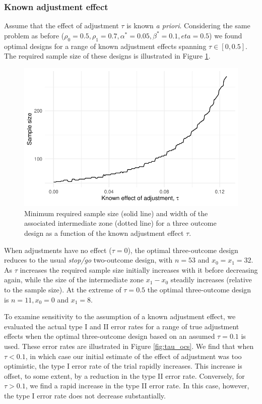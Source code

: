 \documentclass{bmcart}
\begin{document}
\subsubsection{Known adjustment effect}

Assume that the effect of adjustment $\tau$ is known \emph{a priori}. Considering the same problem as before ($\rho_0 = 0.5, \rho_1 = 0.7, \alpha^* = 0.05, \beta^* = 0.1, eta = 0.5$) we found optimal designs for a range of known adjustment effects spanning $\tau \in [0, 0.5]$. The required sample size of these designs is illustrated in Figure \ref{fig:tau_ns}. 

\begin{figure}
\centering
\includegraphics[scale=0.8]{./figures/tau_ns}
\caption{Minimum required sample size (solid line) and width of the associated intermediate zone (dotted line) for a three outcome design as a function of the known adjustment effect $\tau$.}
\label{fig:tau_ns}
\end{figure}

When adjustments have no effect ($\tau = 0$), the optimal three-outcome design reduces to the usual \emph{stop/go} two-outcome design, with $n = 53$ and $x_0 = x_1 = 32$. As $\tau$ increases the required sample size initially increases with it before decreasing again, while the size of the intermediate zone $x_1 - x_0$ steadily increases (relative to the sample size). At the extreme of $\tau = 0.5$ the optimal three-outcome design is $n= 11, x_0 = 0$ and $x_1 = 8$.

To examine sensitivity to the assumption of a known adjustment effect, we evaluated the actual type I and II error rates for a range of true adjustment effects when the optimal three-outcome design based on an assumed $\tau = 0.1$ is used. These error rates are illustrated in Figure \ref{fig:tau_ocs}. We find that when $\tau < 0.1$, in which case our initial estimate of the effect of adjustment was too optimistic, the type I error rate of the trial rapidly increases. This increase is offset, to some extent, by a reduction in the type II error rate. Conversely, for $\tau > 0.1$, we find a rapid increase in the type II error rate. In this case, however, the type I error rate does not decrease substantially. 
\end{document}
